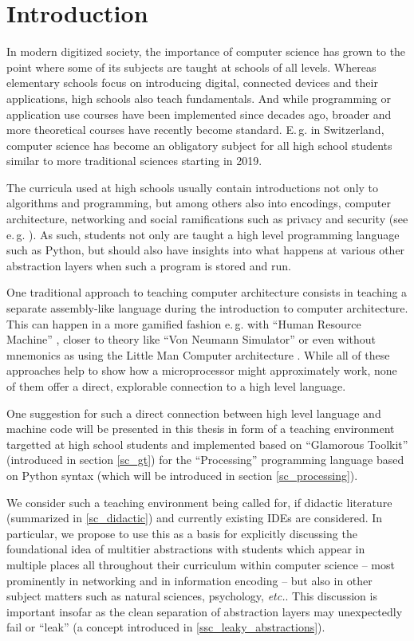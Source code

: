 
\chapter{Introduction}

In modern digitized society, the importance of computer science has grown to the point where some of its subjects are taught at schools of all levels. Whereas elementary schools focus on introducing digital, connected devices and their applications, high schools also teach fundamentals. And while programming or application use courses have been implemented since decades ago, broader and more theoretical courses have recently become standard. E.\,g. in Switzerland, computer science has become an obligatory subject for all high school students similar to more traditional sciences starting in 2019.

The curricula used at high schools usually contain introductions not only to algorithms and programming, but among others also into encodings, computer architecture, networking and social ramifications such as privacy and security (see e.\,g. \cite{Erz16}). As such, students not only are taught a high level programming language such as Python, but should also have insights into what happens at various other abstraction layers when such a program is stored and run.

One traditional approach to teaching computer architecture consists in teaching a separate assembly-like language during the introduction to computer architecture. This can happen in a more gamified fashion e.\,g. with ``Human Resource Machine'' \cite{Tom15}, closer to theory like ``Von Neumann Simulator'' \cite{Gan23} or even without mnemonics as using the Little Man Computer architecture \cite{Oin25}. While all of these approaches help to show how a microprocessor might approximately work, none of them offer a direct, explorable connection to a high level language.

One suggestion for such a direct connection between high level language and machine code will be presented in this thesis in form of a teaching environment targetted at high school students and implemented based on ``Glamorous Toolkit'' (introduced in section \ref{sc_gt}) for the ``Processing'' programming language based on Python syntax (which will be introduced in section \ref{sc_processing}).

We consider such a teaching environment being called for, if didactic literature (summarized in \ref{sc_didactic}) and currently existing IDEs are considered. In particular, we propose to use this as a basis for explicitly discussing the foundational idea of multitier abstractions with students which appear in multiple places all throughout their curriculum within computer science -- most prominently in networking and in information encoding -- but also in other subject matters such as natural sciences, psychology, \emph{etc.}. This discussion is important insofar as the clean separation of abstraction layers may unexpectedly fail or ``leak'' (a concept introduced in \ref{ssc_leaky_abstractions}).

